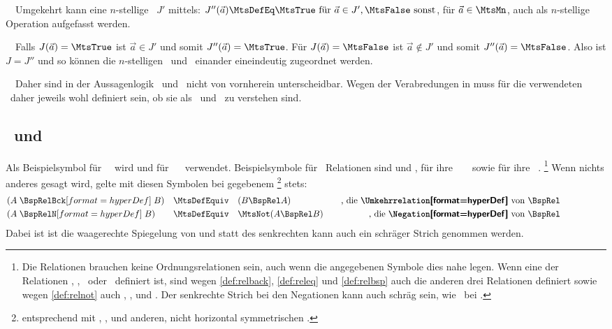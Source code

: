 \begin{description}
{		~~Umgekehrt kann eine $n$-stellige \aussagenlogischeRelation\ $J'$ mittels:
		$J''(\vec{a}) \MtsDefEq \MtsTrue \text{ für } \vec{a} \in J', \MtsFalse \text{ sonst}$, für $\vec{a} \in \MtsMn$, auch als $n$-stellige Operation aufgefasst werden.

		~~Falls $J(\vec{a})=\MtsTrue$ ist $\vec{a} \in J'$ und somit $J''(\vec{a})=\MtsTrue$.
		Für $J(\vec{a})=\MtsFalse$ ist $\vec{a} \notin J'$ und somit $J''(\vec{a})=\MtsFalse$.
		Also ist $J=J''$ und so können die $n$-stelligen \aussagenlogischenRelationen\ und \Operationen\ einander eineindeutig zugeordnet werden.

		~~Daher sind in der Aussagenlogik \Relationen\ und \Operationen\ nicht von vornherein unterscheidbar.
		Wegen der Verabredungen in  muss für die verwendeten \Junktoren\ daher jeweils wohl definiert sein, ob sie als \Relation\ und \Operation\ zu verstehen sind.
	}
\end{description}

\subsection[Relationen und Operationen]{\Relationen\ und \Operationen}%
\label{sub:Beispielsymbole}

Als Beispielsymbol für \unaere\ \Operationen\ wird  und für \binaere\ \Operationen\  verwendet.
Beispielsymbole für \binaere\ Relationen sind  und , für ihre \Umkehrrelationen\  \textbzw\  sowie für ihre   \textbzw\ .%
\footnote{%
	Die Relationen brauchen keine Ordnungsrelationen sein, auch wenn die angegebenen Symbole dies nahe legen.
	Wenn eine der Relationen \BspRel, \BspRelEq, \BspRelBck\ oder \BspRelBckEq\ definiert ist,
	sind wegen \eqref{def:relback}, \eqref{def:releq} und \eqref{def:relbsp} auch die anderen drei Relationen definiert sowie wegen \eqref{def:relnot} auch \BspRelN, \BspRelEqN,  und .
	Der senkrechte Strich bei den Negationen kann auch schräg sein, wie \textzB\ bei \MtsEqN.
}
Wenn nichts anderes gesagt wird, gelte mit diesen Symbolen bei gegebenem \chrqt{\BspRel}%
\footnote{%
	entsprechend mit \chrqt{\BspRelBck}, \chrqt{\BspRelEq}, \chrqt{\BspRelBckEq} und anderen, nicht horizontal symmetrischen \Symbolen.
} stets:
\begin{align}
	& (A \defSymBin{\BspRelBck} B) & \MtsDefEquiv \quad &  (B \BspRel A)
	& \quad \text{, die \defTxt{\Umkehrrelation} von } \BspRel
	\label{def:relback} \\
	& (A \defSymBin{\BspRelN}    B) & \MtsDefEquiv \quad & \MtsNot (A \BspRel B)
	& \quad \text{, die \defTxt{\Negation}       von } \BspRel
	\label{def:relnot}  \formulatoleft
\end{align}
Dabei ist \chrqt{\BspRelBck} ist die waagerechte Spiegelung von \chrqt{\BspRel} und statt des senkrechten kann auch ein schräger Strich genommen werden.

